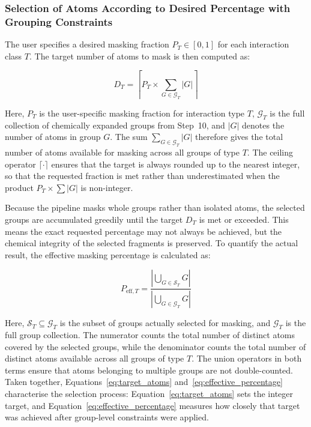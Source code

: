 \documentclass[a4paper,12pt]{article}
\begin{document}
\subsubsection{Selection of Atoms According to Desired Percentage with Grouping Constraints}

The user specifies a desired masking fraction $P_T \in [0, 1]$ for each
interaction class $T$. The target number of atoms to mask is then computed as:

\begin{equation}
    D_T = \left\lceil P_T \times \sum_{G \in \mathcal{G}_T} |G| \right\rceil
    \label{eq:target_atoms}
\end{equation}

\noindent
Here, $P_T$ is the user-specific masking fraction for interaction type $T$,
$\mathcal{G}_T$ is the full collection of chemically expanded groups from
Step~10, and $|G|$ denotes the number of atoms in group $G$. The sum
$\sum_{G \in \mathcal{G}_T} |G|$ therefore gives the total number of atoms
available for masking across all groups of type $T$. The ceiling operator
$\lceil \cdot \rceil$ ensures that the target is always rounded up to the
nearest integer, so that the requested fraction is met rather than
underestimated when the product $P_T \times \sum |G|$ is non-integer.

Because the pipeline masks whole groups rather than isolated atoms, the selected
groups are accumulated greedily until the target $D_T$ is met or exceeded. This
means the exact requested percentage may not always be achieved, but the
chemical integrity of the selected fragments is preserved. To quantify the
actual result, the effective masking percentage is calculated as:

\begin{equation}
    P_{\text{eff},T} =
    \frac{\left| \bigcup_{G \in \mathcal{S}_T} G \right|}
         {\left| \bigcup_{G \in \mathcal{G}_T} G \right|}
    \label{eq:effective_percentage}
\end{equation}

\noindent
Here, $\mathcal{S}_T \subseteq \mathcal{G}_T$ is the subset of groups actually
selected for masking, and $\mathcal{G}_T$ is the full group collection. The
numerator counts the total number of distinct atoms covered by the selected
groups, while the denominator counts the total number of distinct atoms
available across all groups of type $T$. The union operators in both terms
ensure that atoms belonging to multiple groups are not double-counted.
Taken together, Equations~\ref{eq:target_atoms} and~\ref{eq:effective_percentage}
characterise the selection process: Equation~\ref{eq:target_atoms} sets the integer target, and Equation~\ref{eq:effective_percentage} measures how closely that target was achieved after group-level constraints were applied.
\end{document}

